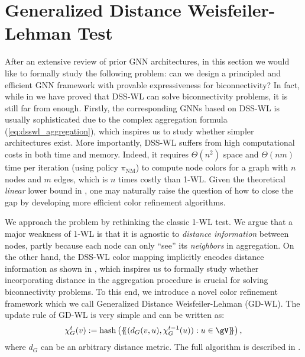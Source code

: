 \documentclass{article}
\let\cref\crtcref
\newcommand*{\ldblbrace}{\{\mskip-5mu\{}
\newcommand*{\rdblbrace}{\}\mskip-5mu\}}
\begin{document}
\section{Generalized Distance Weisfeiler-Lehman Test}
\vspace{-2pt}
\label{sec:gdwl}
After an extensive review of prior GNN architectures, in this section we would like to formally study the following problem: can we design a principled and efficient GNN framework with provable expressiveness for biconnectivity? In fact, while in \cref{sec:esan} we have proved that DSS-WL can solve biconnectivity problems, it is still far from enough. Firstly, the corresponding GNNs based on DSS-WL is usually sophisticated due to the complex aggregation formula (\ref{eq:dsswl_aggregation}), which inspires us to study whether simpler architectures exist. More importantly, DSS-WL suffers from high computational costs in both time and memory. Indeed, it requires $\Theta(n^2)$ space and $\Theta(nm)$ time per iteration (using policy $\pi_\mathrm{NM}$) to compute node colors for a graph with $n$ nodes and $m$ edges, which is $n$ times costly than 1-WL. Given the theoretical \emph{linear} lower bound in \cref{thm:tarjan}, one may naturally raise the question of how to close the gap by developing more efficient color refinement algorithms.

\vspace{-1pt}

We approach the problem by rethinking the classic 1-WL test. We argue that a major weakness of 1-WL is that it is agnostic to \emph{distance information} between nodes, partly because each node can only ``see'' its \emph{neighbors} in aggregation. On the other hand, the DSS-WL color mapping implicitly encodes distance information as shown in \cref{sec:esan}, which inspires us to formally study whether incorporating distance in the aggregation procedure is crucial for solving biconnectivity problems. To this end, we introduce a novel color refinement framework which we call Generalized Distance Weisfeiler-Lehman (GD-WL). The update rule of GD-WL is very simple and can be written as:
\begin{equation}
    \label{eq:gdwl}
    \chi_G^t(v):= \operatorname{hash}\left(\ldblbrace (d_G(v,u), \chi_G^{t-1}(u)):u\in \gV\rdblbrace\right),
\end{equation}
where $d_G$ can be an arbitrary distance metric. The full algorithm is described in \cref{alg:gdwl}.

\vspace{-1pt}
\end{document}
